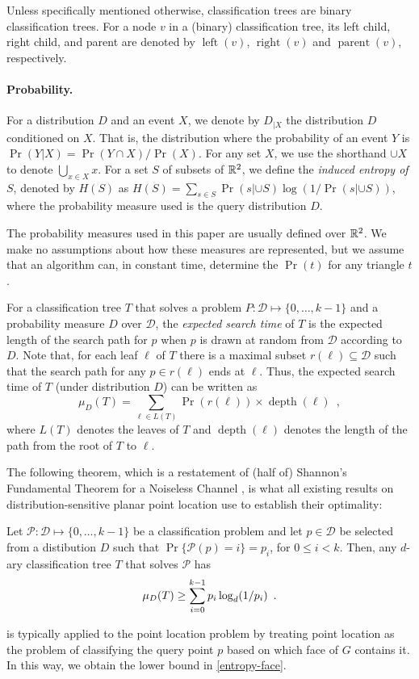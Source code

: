 \documentclass[charterfonts,lotsofwhite]{patmorin}
\DeclareMathOperator{\depth}{depth}
\DeclareMathOperator{\lft}{left}
\DeclareMathOperator{\rght}{right}
\DeclareMathOperator{\prnt}{parent}
\begin{document}
Unless specifically mentioned otherwise, classification trees are
binary classification trees.  For a node $v$ in a (binary)
classification tree, its left child, right child, and parent are
denoted by $\lft(v)$, $\rght(v)$ and $\prnt(v)$, respectively.


\paragraph{Probability.}

For a distribution $D$ and an event $X$, we denote by $D_{|X}$ the
distribution $D$ conditioned on $X$.  That is, the distribution where
the probability of an event $Y$ is $\Pr(Y|X)=\Pr(Y\cap X)/\Pr(X)$.
For any set $X$, we use the shorthand $\cup X$ to denote
$\bigcup_{x\in X} x$.  For a set $S$ of subsets of $\mathbb{R}^2$, we define
the \emph{induced entropy of $S$}, denoted by $H(S)$ as
$H(S)=\sum_{s\in S}\Pr(s|{\cup S})\log(1/\Pr(s|{\cup S}))$, where the
probability measure used is the query distribution $D$.

The probability measures used in this paper are usually defined over
$\mathbb{R}^2$.  We make no assumptions about how these measures are
represented, but we assume that an algorithm can, in constant time,
determine the $\Pr(t)$ for any triangle $t$.

For a classification tree $T$ that solves a problem
$P:\mathcal{D}\mapsto\{0,\ldots,k-1\}$ and a probability measure $D$
over $\mathcal{D}$, the \emph{expected search time} of $T$ is the
expected length of the search path for $p$ when $p$ is drawn at random
from $\mathcal{D}$ according to $D$.  Note that, for each leaf $\ell$
of $T$ there is a maximal subset $r(\ell)\subseteq \mathcal{D}$ such
that the search path for any $p\in r(\ell)$ ends at $\ell$.  Thus, the
expected search time of $T$ (under distribution $D$) can be written as
\[
     \mu_D(T) = \sum_{\ell\in L(T)} \Pr(r(\ell))\times \depth(\ell)
	\enspace ,
\]
where $L(T)$ denotes the leaves of $T$ and $\depth(\ell)$ denotes the
length of the path from the root of $T$ to $\ell$.

The following theorem, which is a restatement of (half of) Shannon's
Fundamental Theorem for a Noiseless Channel \cite[Theorem 9]{s48}, is
what all existing results on distribution-sensitive planar point
location use to establish their optimality:

\begin{thm}
Let $\mathcal{P}:\mathcal{D}\mapsto \{0,\ldots,k-1\}$ be a classification
problem and let $p\in \mathcal{D}$ be selected from a distibution $D$ such
that $\Pr\{\mathcal{P}(p)= i\}=p_i$, for $0\le i< k$.  Then, any
$d$-ary classification tree $T$ that solves $\mathcal{P}$ has
\begin{equation}
     \mu_D(T) \ge \sum_{i=0}^{k-1} p_i\log_d(1/p_i) \enspace .
	\eqlabel{shannon}
\end{equation}
\end{thm}
 is typically applied to the point location problem by
treating point location as the problem of classifying the query point
$p$ based on which face of $G$ contains it.  In this way, we obtain
the lower bound in \eqref{entropy-face}.
\end{document}
